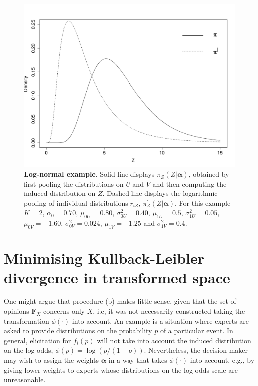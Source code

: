 \documentclass[a4paper, notitlepage, 10pt]{article}
\begin{document}
\begin{figure}[!ht]
\centering
\includegraphics[scale=0.5]{figures/lognormal_example.pdf}
\caption{\textbf{Log-normal example}. Solid line displays $\pi_Z(Z | \boldsymbol\alpha)$, obtained by first pooling the distributions on $U$ and $V$ and then computing the induced distribution on $Z$.
Dashed line displays the logarithmic pooling of individual distributions $r_{iZ}$, $\pi_Z^{\prime}(Z | \boldsymbol\alpha)$.
For this example $K=2$, $\alpha_0 = 0.70$, $\mu_{0U} = 0.80$, $\sigma_{0U}^2 = 0.40$, $\mu_{1U} = 0.5$, $\sigma_{1U}^2 = 0.05$, $\mu_{0V} = -1.60$, $\sigma_{0V}^2 = 0.024$, $\mu_{1V} = -1.25$ and  $\sigma_{1V}^2 = 0.4$.
}
\label{fig:lognormal_example}
\end{figure}


\section*{Minimising Kullback-Leibler divergence in transformed space}

One might argue that procedure (b) makes little sense, given that the set of opinions $\mathbf{F}_{X}$ concerns only $X$, i.e, it was not necessarily constructed taking the transformation $\phi(\cdot)$ into account.
An example is a situation where experts are asked to provide distributions on the probability $p$ of a particular event.
In general, elicitation for $f_i(p)$ will not take into account the induced distribution on the log-odds, $\phi(p) = \log \left( p/(1-p) \right)$.
Nevertheless, the decision-maker may wish to assign the weights $\boldsymbol\alpha$ in a way that takes $\phi(\cdot)$ into account, e.g., by giving lower weights to experts whose distributions on the log-odds scale are unreasonable.
\end{document}
